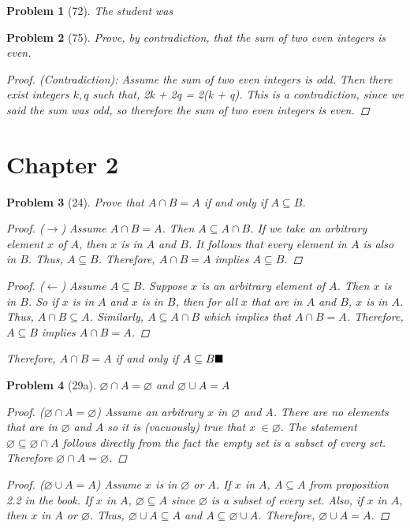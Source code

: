 \documentclass{article}
\let\emptyset\varnothing
\theoremstyle{problem}
\newtheorem{prob}{Problem}
\renewcommand{\qedsymbol}{$\blacksquare$}
\def\bs{\hspace{\stretch1}\ensuremath\blacksquare}
\begin{document}
\begin{prob}[72]
The student was 
\end{prob}

\begin{prob}[75]
  Prove, by contradiction, that the sum of two even integers is even.
\begin{proof}\textit{(Contradiction)}: Assume the sum of two even integers is odd. Then there exist integers $k,q$ such that, 2k + 2q = 2(k + q). This is a contradiction, since we said the sum was odd, so therefore the sum of two even integers is even.
\end{proof}

\end{prob}

\section*{Chapter 2}
\begin{prob}[24]
Prove that $A \cap B = A$ if and only if $A \subseteq B$.
\renewcommand\qedsymbol{}
\begin{proof}($\rightarrow$)
Assume $A \cap B = A$. Then $A \subseteq A \cap B$. If we take an arbitrary element $x$ of $A$, then $x$ is in $A$ and $B$. It follows that every element in $A$ is also in $B$. Thus, $A \subseteq B$. Therefore, $A \cap B = A$ implies $A \subseteq B$.
\end{proof}
\begin{proof}($\leftarrow$)
Assume $A \subseteq B$. Suppose $x$ is an arbitrary element of $A$. Then $x$ is in $B$. So if $x$ is in $A$ and $x$ is in $B$, then for all $x$ that are in $A$ and $B$, $x$ is in $A$. Thus, $A \cap B \subseteq A$. Similarly, $A \subseteq A \cap B$ which implies that $A \cap B = A$. Therefore, $A \subseteq B$ implies $A \cap B = A$.
\end{proof}
\renewcommand{\qedsymbol}{$\blacksquare$}
Therefore, $A \cap B = A$ if and only if $A \subseteq B\bs$
\end{prob}

\begin{prob}[29a]
$\emptyset \cap A = \emptyset$ and $\emptyset \cup A = A$
\begin{proof}($\emptyset \cap A = \emptyset$)
Assume an arbitrary $x$ in $\emptyset$ and A. There are no elements that are in $\emptyset$ and $A$ so it is (vacuously) true that x $\in \emptyset$. The statement
$\emptyset \subseteq \emptyset \cap A$ follows directly from the fact the empty set is a subset of every set. Therefore $\emptyset \cap A = \emptyset$.
\end{proof}
\begin{proof}($\emptyset \cup A = A$)
Assume $x$ is in $\emptyset$ or $A$. If $x$ in $A$, $A \subseteq A$ from \textit{proposition 2.2} in the book. If $x$ in $A$, $\emptyset \subseteq A$ since $\emptyset$ is a subset of every set. Also, if $x$ in $A$, then $x$ in $A$ or $\emptyset$. Thus, $\emptyset \cup A \subseteq A$ and $A \subseteq \emptyset \cup A$. Therefore, $\emptyset \cup A = A$.
\end{proof}
\end{prob}
\end{document}
